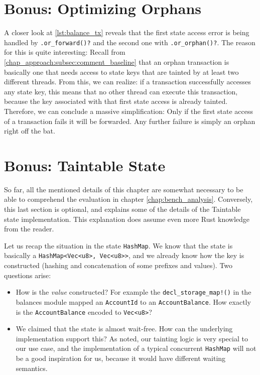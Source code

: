 \section{Bonus: Optimizing Orphans} \label{chap_impl:sec:opt_orph}

A closer look at \ref{lst:balance_tx} reveals that the first state access error is being handled by
\texttt{.or\_forward()?} and the second one with \texttt{.or\_orphan()?}. The reason for this is
quite interesting: Recall from \ref{chap_approach:subsec:comment_baseline} that an orphan
transaction is basically one that needs access to state keys that are tainted by at least two
different threads. From this, we can realize: if a transaction successfully accesses any state key,
this means that no other thread can execute this transaction, because the key associated with that
first state access is already tainted. Therefore, we can conclude a massive simplification: Only if
the first state access of a transaction fails it will be forwarded. Any further failure is simply
an orphan right off the bat.

\section{Bonus: Taintable State} \label{chap_impl:sec:bonus}

So far, all the mentioned details of this chapter are somewhat necessary to be able to comprehend
the evaluation in chapter \ref{chap:bench_analysis}. Conversely, this last section is optional, and
explains some of the details of the Taintable state implementation. This explanation does assume
even more Rust knowledge from the reader.

Let us recap the situation in the state \texttt{HashMap}. We know that the state is basically a
\texttt{HashMap<Vec<u8>, Vec<u8>>}, and we already know how the key is constructed (hashing and
concatenation of some prefixes and values). Two questions arise:

\begin{itemize}
    \item How is the \textit{value} constructed? For example the \texttt{decl\_storage\_map!()} in
    the balances module mapped an \texttt{AccountId} to an \texttt{AccountBalance}. How exactly is
    the \texttt{AccountBalance} encoded to \texttt{Vec<u8>}?
    \item We claimed that the state is almost wait-free. How can the underlying implementation
    support this? As noted, our tainting logic is very special to our use case, and the
    implementation of a typical concurrent \texttt{HashMap} will not be a good inspiration for us,
    because it would have different waiting semantics.
\end{itemize}

